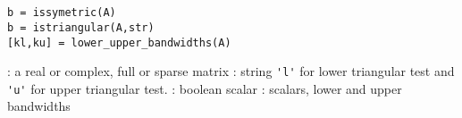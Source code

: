 
\begin{mandesc}
  \\
  \\
\end{mandesc}

\begin{calling_sequence}
\begin{verbatim}
b = issymetric(A)
b = istriangular(A,str)
[kl,ku] = lower_upper_bandwidths(A)
\end{verbatim}
\end{calling_sequence}
\begin{parameters}
  \begin{varlist}
    : a real or complex, full or sparse matrix
    : string \verb+'l'+ for lower triangular test and
    \verb+'u'+ for upper triangular test.
    : boolean scalar
    : scalars, lower and upper bandwidths
  \end{varlist}
\end{parameters}

